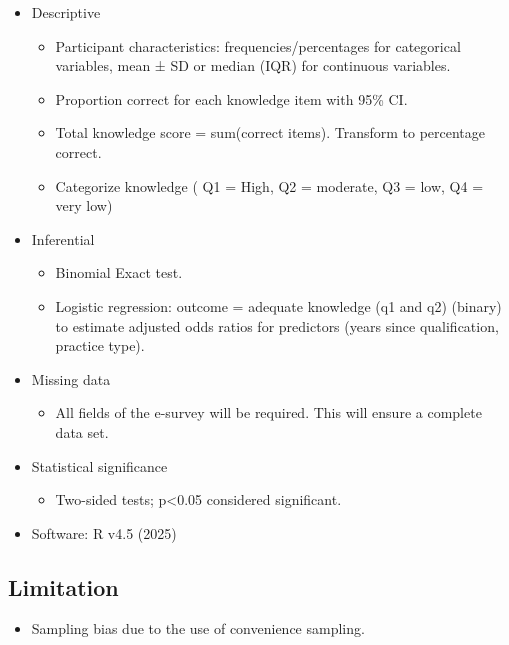 \documentclass[
  letterpaper,
  DIV=11,
  numbers=noendperiod]{scrartcl}
\providecommand{\tightlist}{%
  \setlength{\itemsep}{0pt}\setlength{\parskip}{0pt}}
\begin{document}
\begin{itemize}
\item
  Descriptive

  \begin{itemize}
  \item
    Participant characteristics: frequencies/percentages for categorical
    variables, mean ± SD or median (IQR) for continuous variables.
  \item
    Proportion correct for each knowledge item with 95\% CI.
  \item
    Total knowledge score = sum(correct items). Transform to percentage
    correct.
  \item
    Categorize knowledge ( Q1 = High, Q2 = moderate, Q3 = low, Q4 = very
    low)
  \end{itemize}
\item
  Inferential

  \begin{itemize}
  \item
    Binomial Exact test.
  \item
    Logistic regression: outcome = adequate knowledge (q1 and q2)
    (binary) to estimate adjusted odds ratios for predictors (years
    since qualification, practice type).
  \end{itemize}
\item
  Missing data

  \begin{itemize}
  \tightlist
  \item
    All fields of the e-survey will be required. This will ensure a
    complete data set.
  \end{itemize}
\item
  Statistical significance

  \begin{itemize}
  \tightlist
  \item
    Two-sided tests; p\textless0.05 considered significant.
  \end{itemize}
\item
  Software: R v4.5 (2025)
\end{itemize}

\subsection{Limitation}\label{limitation}

\begin{itemize}
\tightlist
\item
  Sampling bias due to the use of convenience sampling.
\end{itemize}
\end{document}
